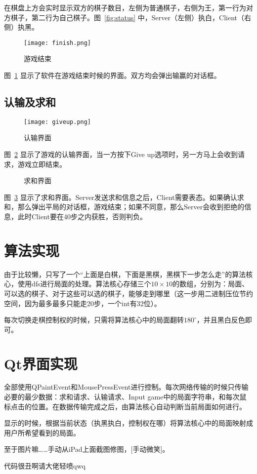 \documentclass[a4paper]{article}
\begin{document}
在棋盘上方会实时显示双方的棋子数目，左侧为普通棋子，右侧为王，第一行为对方棋子，第二行为自己棋子。图~\ref{fig:status} 中，Server（左侧）执白，Client（右侧）执黑。

\begin{figure}[htp]
\centering
\texttt{[image: finish.png]}
\caption{游戏结束}
\label{fig:finish}
\end{figure}

图~\ref{fig:finish} 显示了软件在游戏结束时候的界面。双方均会弹出输赢的对话框。

\subsection{认输及求和}

\begin{figure}[htp]
\centering
\texttt{[image: giveup.png]}
\caption{认输界面}
\label{fig:giveup}
\end{figure}

图~\ref{fig:giveup} 显示了游戏的认输界面，当一方按下Give up选项时，另一方马上会收到请求，游戏立即结束。

\begin{figure}[htbp]
\centering
{}%
\hfil
{}%
\caption{求和界面}\label{fig:draw}
\end{figure}

图~\ref{fig:draw} 显示了求和界面。Server发送求和信息之后，Client需要表态。如果确认求和，那么弹出平局的对话框，游戏结束；如果不同意，那么Server会收到拒绝的信息，此时Client要在40步之内获胜，否则判负。

\section{算法实现}

由于比较懒，只写了一个“上面是白棋，下面是黑棋，黑棋下一步怎么走”的算法核心，使用dfs进行局面的处理。算法核心存储三个$10\times 10$的数组，分别为：局面、可以选的棋子、对于这些可以选的棋子，能够走到哪里（这一步用二进制压位节约空间，因为最多最多只能走20步，一个int有32位）。

每次切换走棋控制权的时候，只需将算法核心中的局面翻转$180^\circ$，并且黑白反色即可。

\section{Qt界面实现}

全部使用QPaintEvent和MousePressEvent进行控制。每次网络传输的时候只传输必要的最少数据：求和请求、认输请求、Input game中的局面字符串，和每次鼠标点击的位置。在数据传输完成之后，由算法核心自动判断当前局面如何进行。

显示的时候，根据当前状态（执黑执白，控制权在哪）将算法核心中的局面映射成用户所希望看到的局面。

至于图片嘛……手动从iPad上面截图修图，[手动微笑]。

代码很丑啊请大佬轻喷qwq
\end{document}
